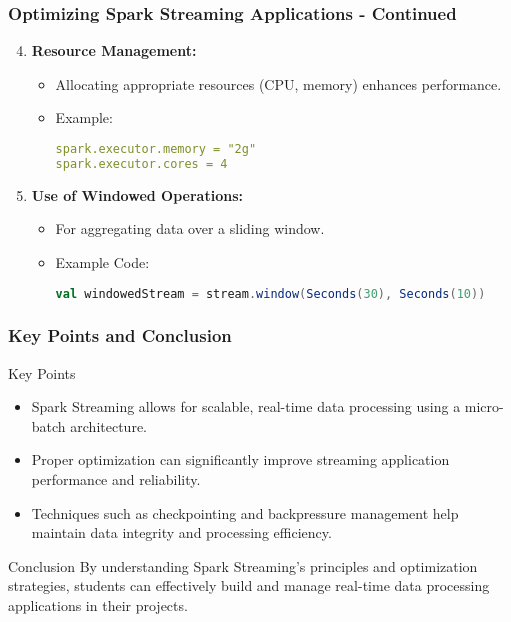 \documentclass[aspectratio=169]{beamer}
\begin{document}
\begin{frame}[fragile]
    \frametitle{Optimizing Spark Streaming Applications - Continued}
    \begin{enumerate}
        \setcounter{enumi}{3} %
        \item \textbf{Resource Management:}
            \begin{itemize}
                \item Allocating appropriate resources (CPU, memory) enhances performance.
                \item Example:
                \begin{lstlisting}[language=yaml]
spark.executor.memory = "2g"
spark.executor.cores = 4
                \end{lstlisting}
            \end{itemize}

        \item \textbf{Use of Windowed Operations:}
            \begin{itemize}
                \item For aggregating data over a sliding window.
                \item Example Code:
                \begin{lstlisting}[language=scala]
val windowedStream = stream.window(Seconds(30), Seconds(10))
                \end{lstlisting}
            \end{itemize}
    \end{enumerate}
\end{frame}

\begin{frame}[fragile]
    \frametitle{Key Points and Conclusion}
    \begin{block}{Key Points}
        \begin{itemize}
            \item Spark Streaming allows for scalable, real-time data processing using a micro-batch architecture.
            \item Proper optimization can significantly improve streaming application performance and reliability.
            \item Techniques such as checkpointing and backpressure management help maintain data integrity and processing efficiency.
        \end{itemize}
    \end{block}
    \begin{block}{Conclusion}
        By understanding Spark Streaming's principles and optimization strategies, students can effectively build and manage real-time data processing applications in their projects.
    \end{block}
\end{frame}
\end{document}
